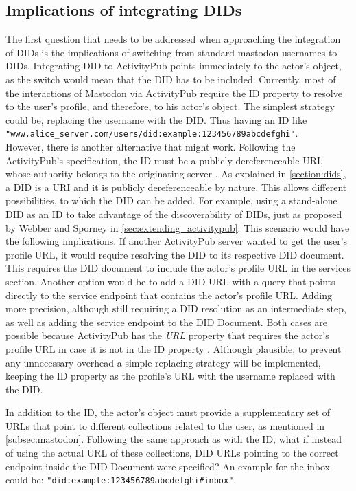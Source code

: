 \subsection{Implications of integrating DIDs}
The first question that needs to be addressed when approaching the integration of DIDs is the implications of switching from standard mastodon usernames to DIDs. Integrating DID to ActivityPub points immediately to the actor's object, as the switch would mean that the DID has to be included. Currently, most of the interactions of Mastodon via ActivityPub require the ID property to resolve to the user's profile, and therefore, to his actor's object. The simplest strategy could be, replacing the username with the DID. Thus having an ID like \verb|"www.alice_server.com/users/did:example:123456789abcdefghi"|.\\
However, there is another alternative that might work. Following the ActivityPub's specification, the ID must be a publicly dereferenceable URI, whose authority belongs to the originating server \cite{lemmer-webber_tallon_guy_prodromou_2018}. As explained in \autoref{section:dids}, a DID is a URI and it is publicly dereferenceable by nature. This allows different possibilities, to which the DID can be added. For example, using a stand-alone DID as an ID to take advantage of the discoverability of DIDs, just as proposed by Webber and Sporney in \autoref{sec:extending_activitypub}. This scenario would have the following implications. If another ActivityPub server wanted to get the user's profile URL, it would require resolving the DID to its respective DID document. This requires the DID document to include the actor's profile URL in the services section. Another option would be to add a DID URL with a query that points directly to the service endpoint that contains the actor's profile URL. Adding more precision, although still requiring a DID resolution as an intermediate step, as well as adding the service endpoint to the DID Document. Both cases are possible because ActivityPub has the \emph{URL} property that requires the actor's profile URL in case it is not in the ID property \cite{lemmer-webber_tallon_guy_prodromou_2018}. Although plausible, to prevent any unnecessary overhead a simple replacing strategy will be implemented, keeping the ID property as the profile's URL with the username replaced with the DID.

In addition to the ID, the actor's object must provide a supplementary set of URLs that point to different collections related to the user, as mentioned in \autoref{subsec:mastodon}. Following the same approach as with the ID, what if instead of using the actual URL of these collections, DID URLs pointing to the correct endpoint inside the DID Document were specified? An example for the inbox could be: \verb|"did:example:123456789abcdefghi#inbox"|.

